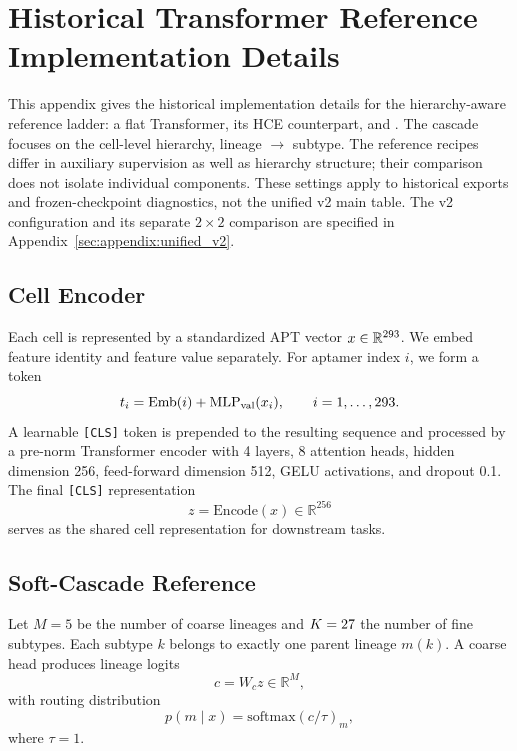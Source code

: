 \section{Historical Transformer Reference Implementation Details}
\label{sec:method}

This appendix gives the historical implementation details for the hierarchy-aware
reference ladder: a flat
Transformer, its HCE counterpart, and \ourmethod{}. The cascade focuses on the
cell-level hierarchy, lineage $\rightarrow$ subtype. The
reference recipes differ in auxiliary supervision as well as hierarchy
structure; their comparison does not isolate individual components.
These settings apply to historical exports and frozen-checkpoint diagnostics,
not the unified v2 main table. The v2 configuration and its separate
$2\times2$ comparison are specified in Appendix~\ref{sec:appendix:unified_v2}.

\subsection{Cell Encoder}
\label{sec:method:backbone}

Each cell is represented by a standardized APT vector $x \in \mathbb{R}^{293{}}$. We embed feature identity and feature value separately. For aptamer index $i$, we form a token
\begin{equation}
t_i = \mathrm{Emb}(i) + \mathrm{MLP}_{\mathrm{val}}(x_i), \qquad i=1,\dots,293{}.
\end{equation}
A learnable \texttt{[CLS]} token is prepended to the resulting sequence and processed by a pre-norm Transformer encoder with 4 layers, 8 attention heads, hidden dimension 256, feed-forward dimension 512, GELU activations, and dropout 0.1. The final \texttt{[CLS]} representation
\begin{equation}
z = \mathrm{Encode}(x) \in \mathbb{R}^{256}
\end{equation}
serves as the shared cell representation for downstream tasks.

\subsection{Soft-Cascade Reference}
\label{sec:method:cascade}

Let $M=5$ be the number of coarse lineages and $K=27$ the number of fine subtypes. Each subtype $k$ belongs to exactly one parent lineage $m(k)$. A coarse head produces lineage logits
\begin{equation}
c = W_c z \in \mathbb{R}^{M},
\end{equation}
with routing distribution
\begin{equation}
p(m \mid x) = \mathrm{softmax}(c/\tau)_m,
\end{equation}
where $\tau=1$.

